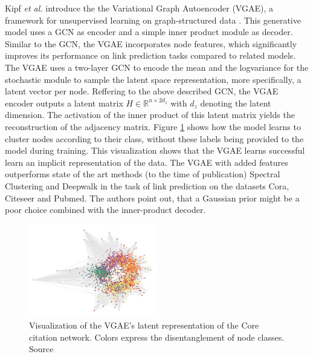 Kipf \textit{et al.} introduce the the Variational Graph Autoencoder (VGAE), a framework for unsupervised learning on graph-structured data \cite{kipf_variational_2016}. This generative model uses a GCN as encoder and a simple inner product module as decoder. Similar to the GCN, the VGAE incorporates node features, which significantly improves its performance on link prediction tasks compared to related models. The VGAE uses a two-layer GCN to encode the mean and the logvariance for the stochastic module to sample the latent space representation, more specifically, a latent vector per node. Reffering to the above described GCN, the VGAE encoder outputs a latent matrix $H \in \mathbb{R}^{n \times 2d_z}$ with $d_z$ denoting the latent dimension. The activation of the inner product of this latent matrix yields the reconstruction of the adjacency matrix. Figure \ref{fig:kipfGVAE} shows how the model learns to cluster  nodes according to their class, without these labels being provided to the model during training.
This visualization shows that the VGAE learns successful learn an implicit representation of the data.
The VGAE with added features outperforms state of the art methods (to the time of publication) Spectral Clustering \cite{tang2011leveraging} and Deepwalk \cite{perozzi2014deepwalk} in the task of link prediction on the datasets Cora, Citeseer and Pubmed. The authors point out, that a Gaussian prior might be a poor choice combined with the inner-product decoder.

\begin{figure}[h]
    \centering
    \includegraphics[width=0.5\textwidth]{data/images/KipGVAE.jpg}
    \caption{Visualization of the VGAE's latent representation of the Core citation network. Colors express the disentanglement of node classes. Source \cite{kipf_variational_2016}}
    \label{fig:kipfGVAE}
\end{figure}



